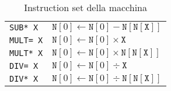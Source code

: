 \documentclass[italian, 10pt]{article}
\begin{document}
\begin{table}[htbp]
\begin{minipage}[t]{.3\textwidth}
{\begin{tabular}[t]{ll}
        \texttt{SUB* X}     & \(\texttt{N}[0] \leftarrow \texttt{N}[0] - \texttt{N}[\texttt{N}[\texttt{X}]]\)      \\
        \texttt{MULT= X}    & \(\texttt{N}[0] \leftarrow \texttt{N}[0] \times \texttt{X}\)                         \\
        \texttt{MULT* X}    & \(\texttt{N}[0] \leftarrow \texttt{N}[0] \times \texttt{N}[\texttt{N}[\texttt{X}]]\) \\
        \texttt{DIV= X}     & \(\texttt{N}[0] \leftarrow \texttt{N}[0] \div \texttt{X}\)                           \\
        \texttt{DIV* X}     & \(\texttt{N}[0] \leftarrow \texttt{N}[0] \div \texttt{N}[\texttt{N}[\texttt{X}]]\)   \\
      \end{tabular}
    }
  \end{minipage}
  \begin{minipage}[t]{.3\textwidth}
  \end{minipage}
  \bigskip
  \caption{Instruction set della macchina \RAM}
  \label{tab:instruction-set-macchina-RAM}
\end{table}
\end{document}
